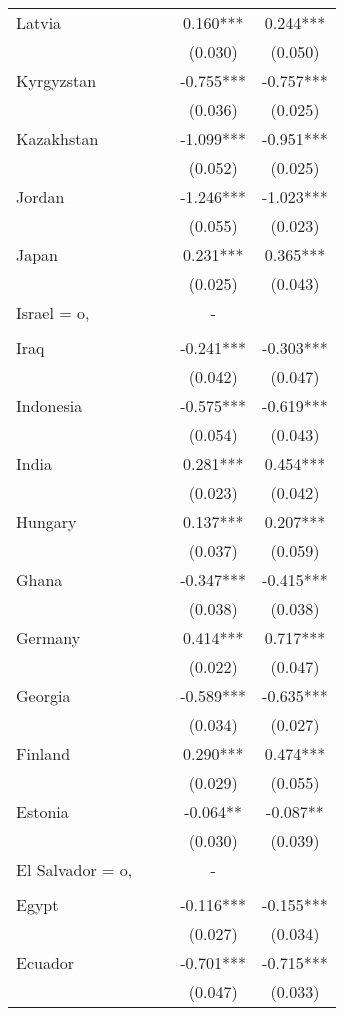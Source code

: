 \documentclass[]{article}
\begin{document}
\begin{tabular}{lcccc}
Latvia &  &  & 0.160*** & 0.244*** \\
 &  &  & (0.030) & (0.050) \\
Kyrgyzstan &  &  & -0.755*** & -0.757*** \\
 &  &  & (0.036) & (0.025) \\
Kazakhstan &  &  & -1.099*** & -0.951*** \\
 &  &  & (0.052) & (0.025) \\
Jordan &  &  & -1.246*** & -1.023*** \\
 &  &  & (0.055) & (0.023) \\
Japan &  &  & 0.231*** & 0.365*** \\
 &  &  & (0.025) & (0.043) \\
Israel = o, &  &  & - &  \\
 &  &  &  &  \\
Iraq &  &  & -0.241*** & -0.303*** \\
 &  &  & (0.042) & (0.047) \\
Indonesia &  &  & -0.575*** & -0.619*** \\
 &  &  & (0.054) & (0.043) \\
India &  &  & 0.281*** & 0.454*** \\
 &  &  & (0.023) & (0.042) \\
Hungary &  &  & 0.137*** & 0.207*** \\
 &  &  & (0.037) & (0.059) \\
Ghana &  &  & -0.347*** & -0.415*** \\
 &  &  & (0.038) & (0.038) \\
Germany &  &  & 0.414*** & 0.717*** \\
 &  &  & (0.022) & (0.047) \\
Georgia &  &  & -0.589*** & -0.635*** \\
 &  &  & (0.034) & (0.027) \\
Finland &  &  & 0.290*** & 0.474*** \\
 &  &  & (0.029) & (0.055) \\
Estonia &  &  & -0.064** & -0.087** \\
 &  &  & (0.030) & (0.039) \\
El Salvador = o, &  &  & - &  \\
 &  &  &  &  \\
Egypt &  &  & -0.116*** & -0.155*** \\
 &  &  & (0.027) & (0.034) \\
Ecuador &  &  & -0.701*** & -0.715*** \\
 &  &  & (0.047) & (0.033) \\

\end{tabular}
\end{document}
